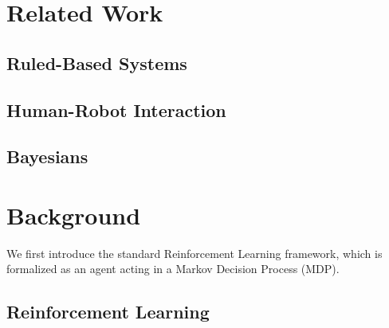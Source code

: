 \documentclass[11pt]{article}
\begin{document}



\section{Related Work}

\subsection{Ruled-Based Systems}


\subsection{Human-Robot Interaction}


\subsection{Bayesians}


\section{Background}

We first introduce the standard Reinforcement Learning framework, which is formalized as an agent acting in a Markov Decision Process (MDP).


\subsection{Reinforcement Learning}
\end{document}
